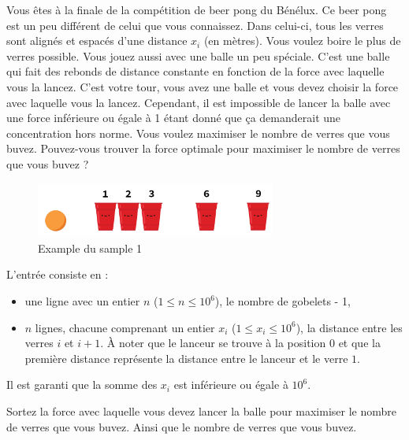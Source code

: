 \problemname{\problemyamlname}


\newcommand{\maxn}{10^{6}}

Vous êtes à la finale de la compétition de beer pong du Bénélux. Ce beer pong est un peu différent de celui que vous connaissez. Dans celui-ci, tous les verres sont alignés et espacés d'une distance $x_i$ (en mètres). Vous voulez boire le plus de verres possible. Vous jouez aussi avec une balle un peu spéciale. C'est une balle qui fait des rebonds de distance constante en fonction de la force avec laquelle vous la lancez.
C'est votre tour, vous avez une balle et vous devez choisir la force avec laquelle vous la lancez. Cependant, il est impossible de lancer la balle avec une force inférieure ou égale à 1 étant donné que ça demanderait une concentration hors norme. Vous voulez maximiser le nombre de verres que vous buvez. Pouvez-vous trouver la force optimale pour maximiser le nombre de verres que vous buvez ?
\smallskip
\begin{figure}[h]
    \centering
    \includegraphics[width=0.7\textwidth]{illustration.png}
    \caption{Example du sample 1}
\end{figure}

\begin{Input}
    L'entrée consiste en :
    \begin{itemize}
        \item une ligne avec un entier  $n$ ($1\leq n\leq \maxn$), le nombre de gobelets - 1,
        \item $n$ lignes, chacune comprenant un entier $x_i$ ($1\leq x_i\leq \maxn$), la distance entre les verres $i$ et $i+1$. À noter que le lanceur se trouve à la position $0$ et que la première distance représente la distance entre le lanceur et le verre $1$.
    \end{itemize}
    Il est garanti que la somme des $x_i$ est inférieure ou égale à $\maxn$.
\end{Input}

\begin{Output}
    Sortez la force avec laquelle vous devez lancer la balle pour maximiser le nombre de verres que vous buvez. Ainsi que le nombre de verres que vous buvez.
\end{Output}

